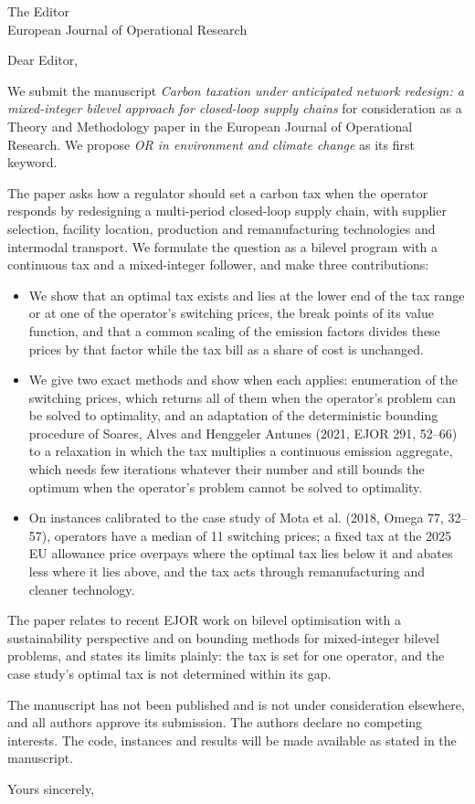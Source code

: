 \documentclass[11pt]{letter}
\begin{document}
\begin{letter}{The Editor\\ European Journal of Operational Research}
\opening{Dear Editor,}

We submit the manuscript \emph{Carbon taxation under anticipated network redesign: a mixed-integer bilevel approach for closed-loop supply chains} for consideration as a Theory and Methodology paper in the European Journal of Operational Research. We propose \emph{OR in environment and climate change} as its first keyword.

The paper asks how a regulator should set a carbon tax when the operator responds by redesigning a multi-period closed-loop supply chain, with supplier selection, facility location, production and remanufacturing technologies and intermodal transport. We formulate the question as a bilevel program with a continuous tax and a mixed-integer follower, and make three contributions:
\begin{itemize}
\item We show that an optimal tax exists and lies at the lower end of the tax range or at one of the operator's switching prices, the break points of its value function, and that a common scaling of the emission factors divides these prices by that factor while the tax bill as a share of cost is unchanged.
\item We give two exact methods and show when each applies: enumeration of the switching prices, which returns all of them when the operator's problem can be solved to optimality, and an adaptation of the deterministic bounding procedure of Soares, Alves and Henggeler Antunes (2021, EJOR 291, 52--66) to a relaxation in which the tax multiplies a continuous emission aggregate, which needs few iterations whatever their number and still bounds the optimum when the operator's problem cannot be solved to optimality.
\item On instances calibrated to the case study of Mota et al. (2018, Omega 77, 32--57), operators have a median of 11 switching prices; a fixed tax at the 2025 EU allowance price overpays where the optimal tax lies below it and abates less where it lies above, and the tax acts through remanufacturing and cleaner technology.
\end{itemize}
The paper relates to recent EJOR work on bilevel optimisation with a sustainability perspective and on bounding methods for mixed-integer bilevel problems, and states its limits plainly: the tax is set for one operator, and the case study's optimal tax is not determined within its gap.

The manuscript has not been published and is not under consideration elsewhere, and all authors approve its submission. The authors declare no competing interests. The code, instances and results will be made available as stated in the manuscript.

\closing{Yours sincerely,}
\end{letter}
\end{document}
